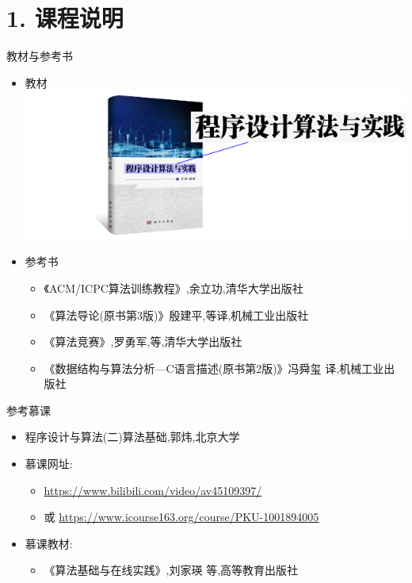 


\frame{\titlepage}
\section{1. 课程说明}
\begin{frame}{教材与参考书}
    \begin{itemize}
        \item 教材
        \includegraphics{fig/1-0.pdf}       
        \item 参考书
        \begin{itemize}
            \item 《ACM/ICPC算法训练教程》,余立功,清华大学出版社
            \item 《算法导论(原书第3版)》殷建平,等译,机械工业出版社
            \item 《算法竞赛》,罗勇军,等,清华大学出版社
            \item 《数据结构与算法分析—C语言描述(原书第2版)》冯舜玺 译,机械工业出版社
        \end{itemize}
    \end{itemize}
\end{frame}
\begin{frame}{参考慕课}
    \begin{itemize}
        \item 程序设计与算法(二)算法基础,郭炜,北京大学
        \vfill
        \item 慕课网址:
        \begin{itemize}
            \item \url{https://www.bilibili.com/video/av45109397/}
            \item 或 \url{https://www.icourse163.org/course/PKU-1001894005}
        \end{itemize}
        \vfill
        \item 慕课教材:
        \begin{itemize}
            \item 《算法基础与在线实践》,刘家瑛 等,高等教育出版社
        \end{itemize}
    \end{itemize}
\end{frame}
